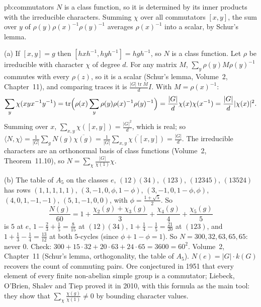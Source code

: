 \begin{solution}{pb:commutators}
\idea $N$ is a class function, so it is determined by its inner products with the irreducible characters. Summing $\chi$ over all
commutators $[x,y]$, the sum over $y$ of $\rho(y)\rho(x)^{-1}\rho(y)^{-1}$ averages $\rho(x)^{-1}$ into a scalar, by Schur's lemma.

\writeup (a) If $[x,y]=g$ then $[hxh^{-1},hyh^{-1}]=hgh^{-1}$, so $N$ is a class function. Let $\rho$ be irreducible with
character $\chi$ of degree $d$. For any matrix $M$, $\sum_y\rho(y)M\rho(y)^{-1}$ commutes with every $\rho(z)$, so it is a scalar
(Schur's lemma, Volume~2, Chapter~11), and comparing traces it is $\frac{|G|\operatorname{tr}M}dI$. With $M=\rho(x)^{-1}$:
\[
\sum_y\chi(xyx^{-1}y^{-1})=\operatorname{tr}\Bigl(\rho(x)\sum_y\rho(y)\rho(x)^{-1}\rho(y)^{-1}\Bigr)=\frac{|G|}d\chi(x)\chi(x^{-1})=\frac{|G|}d|\chi(x)|^2.
\]
Summing over $x$, $\sum_{x,y}\chi([x,y])=\frac{|G|^2}d$, which is real; so
$\langle N,\chi\rangle=\frac1{|G|}\sum_gN(g)\overline{\chi(g)}=\frac1{|G|}\overline{\sum_{x,y}\chi([x,y])}=\frac{|G|}d$. The irreducible characters
are an orthonormal basis of class functions (Volume~2, Theorem~11.10), so $N=\sum_\chi\frac{|G|}{\chi(1)}\chi$.

(b) The table of $A_5$ on the classes $e$, $(12)(34)$, $(123)$, $(12345)$, $(13524)$ has rows $(1,1,1,1,1)$,
$(3,-1,0,\phi,1-\phi)$, $(3,-1,0,1-\phi,\phi)$, $(4,0,1,-1,-1)$, $(5,1,-1,0,0)$, with $\phi=\frac{1+\sqrt5}2$. So
\[
\frac{N(g)}{60}=1+\frac{\chi_2(g)+\chi_3(g)}3+\frac{\chi_4(g)}4+\frac{\chi_5(g)}5
\]
is $5$ at $e$, $1-\frac23+\frac15=\frac8{15}$ at $(12)(34)$, $1+\frac14-\frac15=\frac{21}{20}$ at $(123)$, and $1+\frac13-\frac14=\frac{13}{12}$ at
both $5$-cycles (since $\phi+1-\phi=1$). So $N=300,32,63,65,65$: never $0$. Check: $300+15\cdot32+20\cdot63+24\cdot65=3600=60^2$.
\tools Volume~2, Chapter~11 (Schur's lemma, orthogonality, the table of $A_5$).
\leads $N(e)=|G|\cdot k(G)$ recovers the count of commuting pairs. Ore conjectured in 1951 that every element of every finite
non-abelian simple group is a commutator; Liebeck, O'Brien, Shalev and Tiep proved it in 2010, with this formula as the main tool:
they show that $\sum_\chi\frac{\chi(g)}{\chi(1)}\ne0$ by bounding character values.
\end{solution}

